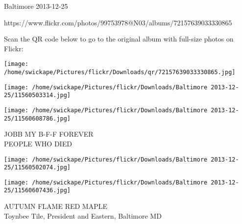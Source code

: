 \documentclass[10pt,letterpaper]{article}
\begin{document}
Baltimore 2013-12-25

https://www.flickr.com/photos/99753978@N03/albums/72157639033330865

Scan the QR code below to go to the original album with full-size photos on Flickr:

\texttt{[image: /home/swickape/Pictures/flickr/Downloads/qr/72157639033330865.jpg]}
\pagebreak

\texttt{[image: /home/swickape/Pictures/flickr/Downloads/Baltimore 2013-12-25/11560503314.jpg]}

\vspace{0.25in}
\texttt{[image: /home/swickape/Pictures/flickr/Downloads/Baltimore 2013-12-25/11560608786.jpg]}

JOBB MY B{-}F{-}F FOREVER\\
PEOPLE WHO DIED
\pagebreak

\texttt{[image: /home/swickape/Pictures/flickr/Downloads/Baltimore 2013-12-25/11560502074.jpg]}

\vspace{0.25in}
\texttt{[image: /home/swickape/Pictures/flickr/Downloads/Baltimore 2013-12-25/11560607436.jpg]}

AUTUMN FLAME RED MAPLE\\
Toynbee Tile, President and Eastern, Baltimore MD
\pagebreak
\end{document}

